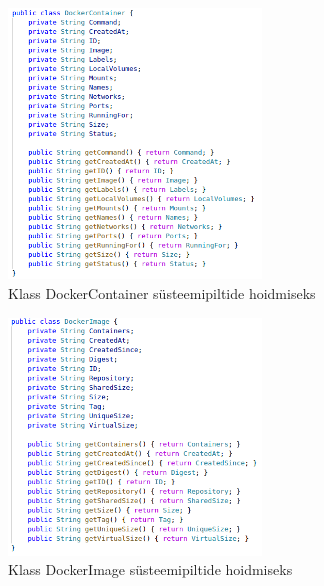 \documentclass[12pt]{article}
\begin{document}
  \begin{figure} [ht] %
  \begin{center}
  \includegraphics[width=0.6\textwidth]{dockerdriver_dockercontainer}
  \caption{Klass DockerContainer süsteemipiltide hoidmiseks}
  \label{fig:dockerdriver_dockercontainer}
  \end{center}
  \end{figure}
 
  \FloatBarrier
  
 
  \begin{figure} [ht] %
  \begin{center}
  \includegraphics[width=0.6\textwidth]{dockerdriver_dockerimage}
  \caption{Klass DockerImage süsteemipiltide hoidmiseks}
  \label{fig:dockerdriver_dockerimage}
  \end{center}
  \end{figure}
 
  \FloatBarrier
 
\end{document}
